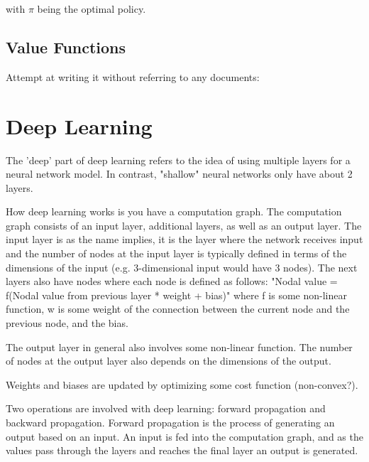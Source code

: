 with $\pi$ being the optimal policy.

\subsection{Value Functions}




Attempt at writing it without referring to any documents:
\section{Deep Learning}
The 'deep' part of deep learning refers to the idea of using multiple layers for a neural network model. In contrast, "shallow" neural networks only have about 2 layers.

How deep learning works is you have a computation graph. The computation graph consists of an input layer, additional layers, as well as an output layer. The input layer is as the name implies, it is the layer where the network receives input and the number of nodes at the input layer is typically defined in terms of the dimensions of the input (e.g. 3-dimensional input would have 3 nodes). The next layers also have nodes where each node is defined as follows: "Nodal value = f(Nodal value from previous layer * weight + bias)" where f is some non-linear function, w is some weight of the connection between the current node and the previous node, and the bias.

The output layer in general also involves some non-linear function. The number of nodes at the output layer also depends on the dimensions of the output.

Weights and biases are updated by optimizing some cost function (non-convex?).

Two operations are involved with deep learning: forward propagation and backward propagation. Forward propagation is the process of generating an output based on an input. An input is fed into the computation graph, and as the values pass through the layers and reaches the final layer an output is generated.

